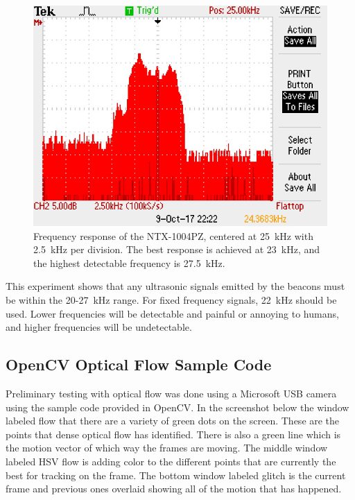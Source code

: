 \documentclass{article}
\begin{document}
    \begin{figure}[H]
      \centering
      \includegraphics[width=0.7\linewidth]{./images/frequency_response.JPG}
      \caption{Frequency response of the NTX-1004PZ, centered at \SI{25}{\kilo\hertz} with \SI{2.5}{\kilo\hertz} per division. The best response is achieved at \SI{23}{\kilo\hertz}, and the highest detectable frequency is \SI{27.5}{\kilo\hertz}.}
      \label{fig:frequency_response}
    \end{figure}

    This experiment shows that any ultrasonic signals emitted by the beacons must be within the 20-27\SI{}{\kilo\hertz} range. For fixed frequency signals, \SI{22}{\kilo\hertz} should be used. Lower frequencies will be detectable and painful or annoying to humans, and higher frequencies will be undetectable.

	\subsection{OpenCV Optical Flow Sample Code}

    Preliminary testing with optical flow was done using a Microsoft USB camera using the sample code provided in OpenCV. In the screenshot below the window labeled flow that there are a variety of green dots on the screen. These are the points that dense optical flow has identified. There is also a green line which is the motion vector of which way the frames are moving. The middle window labeled HSV flow is adding color to the different points that are currently the best for tracking on the frame. The bottom window labeled glitch is the current frame and previous ones overlaid showing all of the motion that has happened.
\end{document}
